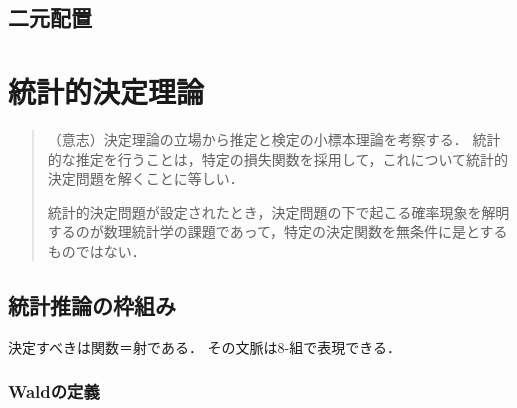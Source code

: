 \documentclass[uplatex,dvipdfmx]{jsreport}
\begin{document}
\section{二元配置}

\chapter{統計的決定理論}

\begin{quotation}
    （意志）決定理論の立場から推定と検定の小標本理論を考察する．
    統計的な推定を行うことは，特定の損失関数を採用して，これについて統計的決定問題を解くことに等しい．

    統計的決定問題が設定されたとき，決定問題の下で起こる確率現象を解明するのが数理統計学の課題であって，特定の決定関数を無条件に是とするものではない．
\end{quotation}

\section{統計推論の枠組み}

\begin{tcolorbox}[colframe=ForestGreen, colback=ForestGreen!10!white,breakable,colbacktitle=ForestGreen!40!white,coltitle=black,fonttitle=\bfseries\sffamily,
title=]
    決定すべきは関数＝射である．
    その文脈は8-組で表現できる．
\end{tcolorbox}

\subsection{Waldの定義}
\end{document}
